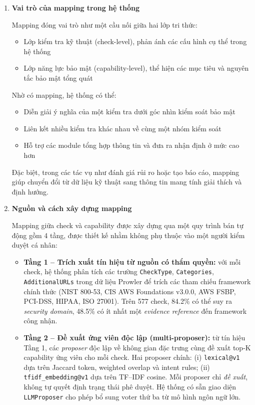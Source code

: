 \begin{enumerate}
    \item \textbf{Vai trò của mapping trong hệ thống}

    Mapping đóng vai trò như một cầu nối giữa hai lớp tri thức:
    \begin{itemize}
        \item Lớp kiểm tra kỹ thuật (check-level), phản ánh các cấu hình cụ thể trong hệ thống
        \item Lớp năng lực bảo mật (capability-level), thể hiện các mục tiêu và nguyên tắc bảo mật tổng quát
    \end{itemize}

    Nhờ có mapping, hệ thống có thể:
    \begin{itemize}
        \item Diễn giải ý nghĩa của một kiểm tra dưới góc nhìn kiểm soát bảo mật
        \item Liên kết nhiều kiểm tra khác nhau về cùng một nhóm kiểm soát
        \item Hỗ trợ các module tổng hợp thông tin và đưa ra nhận định ở mức cao hơn
    \end{itemize}

    Đặc biệt, trong các tác vụ như đánh giá rủi ro hoặc tạo báo cáo, mapping giúp chuyển đổi từ dữ liệu kỹ thuật sang thông tin mang tính giải thích và định hướng.

    \item \textbf{Nguồn và cách xây dựng mapping}

    Mapping giữa check và capability được xây dựng qua một quy trình bán tự động gồm 4 tầng, được thiết kế nhằm không phụ thuộc vào một người kiểm duyệt cá nhân:
    \begin{itemize}
        \item \textbf{Tầng 1 -- Trích xuất tín hiệu từ nguồn có thẩm quyền:} với mỗi check, hệ thống phân tích các trường \texttt{CheckType}, \texttt{Categories}, \texttt{AdditionalURLs} trong dữ liệu Prowler để trích các tham chiếu framework chính thức (NIST 800-53, CIS AWS Foundations v3.0.0, AWS FSBP, PCI-DSS, HIPAA, ISO 27001). Trên 577 check, 84.2\% có thể suy ra \textit{security domain}, 48.5\% có ít nhất một \textit{evidence reference} đến framework công nhận.

        \item \textbf{Tầng 2 -- Đề xuất ứng viên độc lập (multi-proposer):} từ tín hiệu Tầng 1, các \textit{proposer} độc lập về không gian đặc trưng cùng đề xuất top-K capability ứng viên cho mỗi check. Hai proposer chính: (i) \texttt{lexical@v1} dựa trên Jaccard token, weighted overlap và intent rules; (ii) \texttt{tfidf\_embedding@v1} dựa trên TF--IDF cosine. Mỗi proposer chỉ \textit{đề xuất}, không tự quyết định trạng thái phê duyệt. Hệ thống có sẵn giao diện \texttt{LLMProposer} cho phép bổ sung voter thứ ba từ mô hình ngôn ngữ lớn.


\end{itemize}
\end{enumerate}
